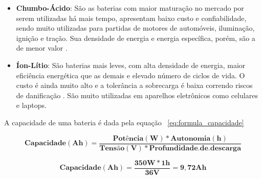 	\begin{itemize}
		\item \textbf{Chumbo-Ácido}: São as baterias com maior maturação no mercado por serem utilizadas há mais tempo, apresentam baixo custo e confiabilidade, sendo muito utilizadas para partidas de motores de automóveis, iluminação, ignição e tração. Sua densidade de energia e energia específica, porém, são a de menor valor \cite{bezerra}.
	\item \textbf{Íon-Lítio}:  São baterias mais leves, com alta densidade de energia, maior eficiência energética que as demais e elevado número de ciclos de vida. O custo é ainda muito alto e a tolerância a sobrecarga é baixa correndo riscos de danificação \cite{bezerra}. São muito utilizadas em aparelhos eletrônicos como celulares e laptops.
	\end{itemize}
	
	A capacidade de uma bateria é dada pela equação ~\ref{eq:formula_capacidade}
	
	\begin{equation}
	\label{eq:formula_capacidade}
	\mathbf{Capacidade(Ah) = \frac{Potência(W) * Autonomia(h)}{Tensão(V) * Profundidade. de. descarga}}
	\end{equation}
	
	\begin{equation}
	\label{eq:calculo_bateria}
	\mathbf{Capacidade(Ah) = \frac{350W * 1h}{36V} = 9,72Ah}
	\end{equation}
	
	

	

	
